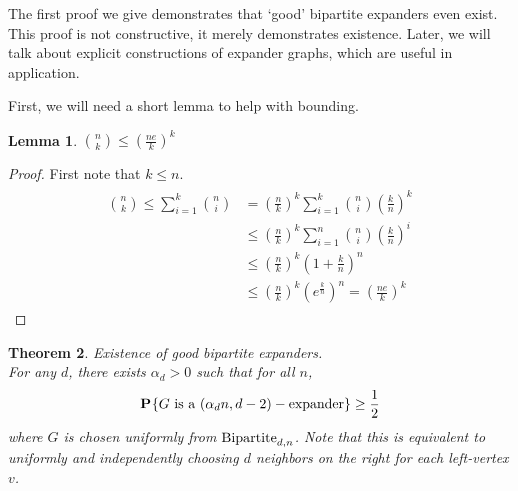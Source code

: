 \documentclass[11pt]{article}
\newtheorem{theorem}{Theorem}[section]
\newtheorem{lemma}[theorem]{Lemma}
\theoremstyle{definition}
\theoremstyle{definition}
\theoremstyle{definition}
\newcommand{\txt}[1]
{\textnormal{#1}}
\newcommand{\prob}[2]
{\textbf{P}_{#1}\{{#2}\}}
\begin{document}
The first proof we give demonstrates that `good' bipartite expanders even exist. This proof is not constructive, it merely demonstrates existence. Later, we will talk about explicit constructions of expander graphs, which are useful in application. 

First, we will need a short lemma to help with bounding. 

\begin{lemma}
${n \choose k} \leq \left(\frac{ne}{k}\right)^k$
\end{lemma}

\begin{proof}
First note that $k \leq n$.
\begin{align}
\begin{split}
{n \choose k} \leq \sum_{i = 1}^k {n \choose i} &= \left(\frac{n}{k}\right)^k \sum_{i = 1}^k {n \choose i} \left(\frac{k}{n}\right)^k
\\
&\leq \left(\frac{n}{k}\right)^k \sum_{i = 1}^n {n \choose i} \left(\frac{k}{n}\right)^i
\\
&\leq \left(\frac{n}{k}\right)^k \left(1 + \frac{k}{n}\right)^n
\\
&\leq \left(\frac{n}{k}\right)^k \left(e^{\frac{k}{n}}\right)^n = \left(\frac{ne}{k}\right)^k
\end{split}
\end{align}
\end{proof}

\begin{theorem} Existence of good bipartite expanders.\\
For any $d$, there exists $\alpha_d > 0$ such that for all $n$, 
\[
\prob{}{G \txt{ is a } (\alpha_d n, d - 2)-\txt{expander}} \geq \frac{1}{2}
\]
where $G$ is chosen uniformly from ${\txt{Bipartite}}_{d, n}$. Note that this is equivalent to uniformly and independently choosing $d$ neighbors on the right for each left-vertex $v$.
\end{theorem}
\end{document}
